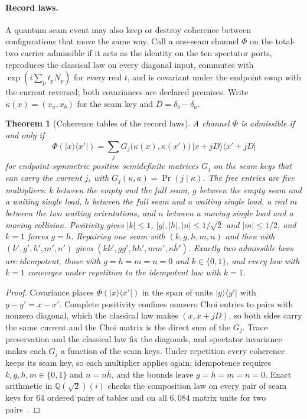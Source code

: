 \documentclass[11pt]{article}
\newtheorem{theorem}{Theorem}[section]
\theoremstyle{remark}
\theoremstyle{plain}
\begin{document}
\paragraph{Record laws.}
A quantum seam event may also keep or destroy coherence between
configurations that move the same way. Call a one-seam channel \(\Phi\) on the
total-two carrier admissible if it acts as the identity on the ten spectator
ports, reproduces the classical law on every diagonal input, commutes with
\(\exp(i\sum_pt_pN_p)\) for every real \(t\), and is covariant under the endpoint
swap with the current reversed; both covariances are declared premises. Write
\(\kappa(x)=(x_a,x_b)\) for the seam key and \(D=\delta_b-\delta_a\).

\begin{theorem}[Coherence tables of the record laws]
\label{thm:record-law-tables}
A channel \(\Phi\) is admissible if and only if
\[
\Phi(|x\rangle\langle x'|)=\sum_jG_j\bigl(\kappa(x),\kappa(x')\bigr)\,
|x+jD\rangle\langle x'+jD|
\]
for endpoint-symmetric positive semidefinite matrices \(G_j\) on the seam keys
that can carry the current \(j\), with \(G_j(\kappa,\kappa)=\Pr(j\mid\kappa)\). The
free entries are five multipliers: \(k\) between the empty and the full seam, \(g\)
between the empty seam and a waiting single load, \(h\) between the full seam and a
waiting single load, a real \(m\) between the two waiting orientations, and \(n\)
between a moving single load and a moving collision. Positivity gives \(|k|\le1\),
\(|g|,|h|,|n|\le1/\sqrt2\) and \(|m|\le1/2\), and \(k=1\) forces \(g=h\). Repairing one
seam with \((k,g,h,m,n)\) and then with \((k',g',h',m',n')\) gives
\((kk',gg',hh',mm',n\bar h')\). Exactly two admissible laws are idempotent, those
with \(g=h=m=n=0\) and \(k\in\{0,1\}\), and every law with \(k=1\) converges under
repetition to the idempotent law with \(k=1\).
\end{theorem}

\begin{proof}
Covariance places \(\Phi(|x\rangle\langle x'|)\) in the span of units
\(|y\rangle\langle y'|\) with \(y-y'=x-x'\). Complete positivity confines nonzero
Choi entries to pairs with nonzero diagonal, which the classical law makes
\((x,x+jD)\), so both sides carry the same current and the Choi matrix is the
direct sum of the \(G_j\). Trace preservation and the classical law fix the
diagonals, and spectator invariance makes each \(G_j\) a function of the seam keys.
Under repetition every coherence keeps its seam key, so each multiplier applies
again; idempotence requires \(k,g,h,m\in\{0,1\}\) and \(n=n\bar h\), and the bounds
leave \(g=h=m=n=0\). Exact arithmetic in \(\mathbb Q(\sqrt2)(i)\) checks the
composition law on every pair of seam keys for \(64\) ordered pairs of tables and on
all \(6{,}084\) matrix units for two pairs~\cite{ophrepo}.
\end{proof}
\end{document}
